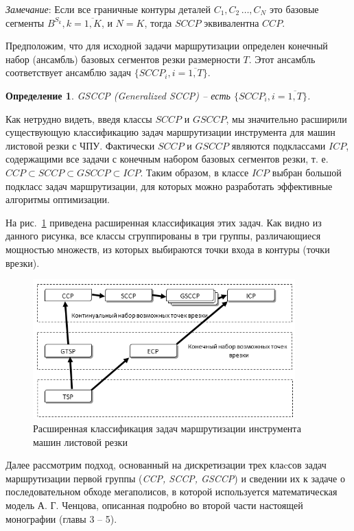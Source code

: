 \documentclass[11pt,twoside,openany]{report}
\newcounter{theo}
\newcounter{pred}
\newcounter{opred}
\newtheorem{opred}{Определение}[section]
\begin{document}
{\it Замечание}:
Если все граничные контуры деталей
$C_1, C_2 \,\dots, C_N$
это базовые сегменты $B^{S_k}, k = \overline{1,K}$,
и $N=K$,
тогда $SCCP$ эквивалентна $CCP$.

Предположим, что для исходной задачи маршрутизации
определен конечный набор (ансамбль)
базовых сегментов резки размерности $T$.
Этот ансамбль соответствует ансамблю задач
$\{SCCP_i, i =\overline{1,T}\}$.

\begin{opred}
  {\it GSCCP (Generalized SCCP)} -- есть
  $\{SCCP_i, i =\overline{1,T}\}$.
\end{opred}

Как нетрудно видеть,
введя классы $SCCP$ и $GSCCP$,
мы значительно расширили существующую
классификацию задач маршрутизации инструмента
для машин листовой резки с ЧПУ.
Фактически $SCCP$ и $GSCCP$ являются подклассами $ICP$,
содержащими все задачи с конечным набором базовых сегментов резки,
т. е.
$CCP \subset SCCP \subset GSCCP \subset ICP$.
Таким образом, в классе $ICP$ выбран большой подкласс
задач маршрутизации,
для которых можно разработать эффективные алгоритмы оптимизации.

На рис.~\ref{x-classify}
приведена расширенная классификация этих задач.
Как видно из данного  рисунка,
все классы сгруппированы в три группы,
различающиеся мощностью множеств,
из которых выбираются точки входа в контуры
(точки врезки).

\begin{figure}[h]
  \begin{center}
  \includegraphics[width=0.9\textwidth]{x-classify.png}
  \caption{Расширенная классификация задач маршрутизации инструмента машин листовой резки }
  \label{x-classify}
  \end{center}
\end{figure}

Далее рассмотрим подход,
основанный на  дискретизации трех клаcсов задач маршрутизации
первой группы ({\it CCP, SCCP, GSCCP})
и сведении их к задаче о последовательном обходе мегаполисов,
в которой  используется математическая модель А. Г. Ченцова,
описанная подробно во второй части настоящей монографии
(главы 3 -- 5).
\end{document}
